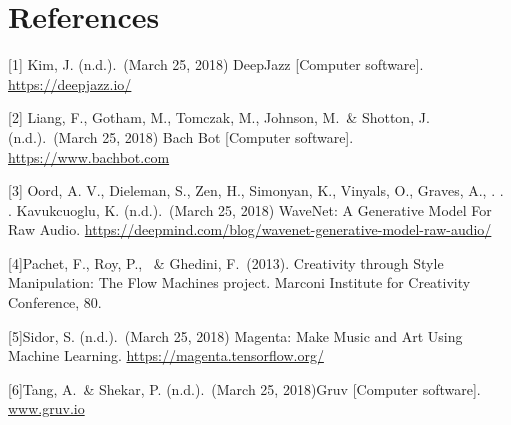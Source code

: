 \documentclass{article}
\begin{document}
\section*{References}

\medskip

\small
 
[1] Kim, J. (n.d.).\ (March 25, 2018) DeepJazz [Computer software]. \href{url}{https://deepjazz.io/}

[2] Liang, F., Gotham, M., Tomczak, M., Johnson, M.\ \& Shotton, J. (n.d.).\ (March 25, 2018) Bach Bot [Computer software]. \href{url}{https://www.bachbot.com}

[3] Oord, A. V., Dieleman, S., Zen, H., Simonyan, K., Vinyals, O., Graves, A., . . . Kavukcuoglu, K. (n.d.).\ (March 25, 2018) WaveNet: A Generative Model For Raw Audio. \href{url}{https://deepmind.com/blog/wavenet-generative-model-raw-audio/}

[4]Pachet, F., Roy, P., \ \& Ghedini, F.\ (2013). Creativity through Style Manipulation: The Flow Machines project. Marconi Institute for Creativity Conference, 80.

[5]Sidor, S. (n.d.).\ (March 25, 2018) Magenta: Make Music and Art Using Machine Learning.  \href{url}{https://magenta.tensorflow.org/}

[6]Tang, A.\ \& Shekar, P. (n.d.).\ (March 25, 2018)Gruv [Computer software].  \href{url}{www.gruv.io}
\end{document}
